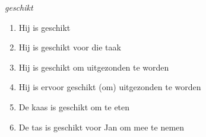 

   \RosDate{\today}
   \RosSupersedes{-}
   \MakeRosTitle
%
%




{\em geschikt}
\begin{enumerate}
  \item 

Hij is geschikt
  \item
Hij is geschikt voor die taak
  \item 

Hij is geschikt om uitgezonden te worden
  \item
Hij is ervoor geschikt (om) uitgezonden te worden
  \item 

De kaas is geschikt om te eten
  \item
De tas is geschikt voor Jan om mee te nemen

\end{enumerate}





